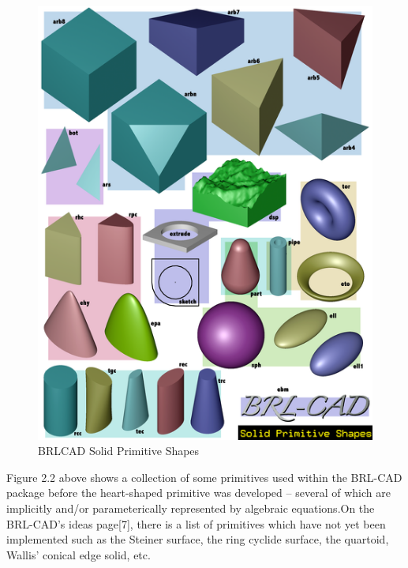 \begin{figure}[htbp]
\centering
\includegraphics[trim=0.1cm 0.3cm 0.5cm 0.5cm, clip=true, totalheight=0.5\textheight]{Figures/Primitives.png}
\caption[BRL­CAD Solid Primitive Shapes]{BRL­CAD Solid Primitive Shapes}
\label{Primitives}
\end{figure}


Figure 2.2 above shows a collection of some primitives used within the BRL-­CAD package before the heart-­shaped primitive   was developed – several of which are implicitly and/or parameterically represented by algebraic equations.On the BRL-­CAD's   ideas page[7], there is a list of primitives which have not yet been implemented such as the Steiner surface, the ring 
cyclide surface, the quartoid, Wallis' conical edge solid, etc.  


